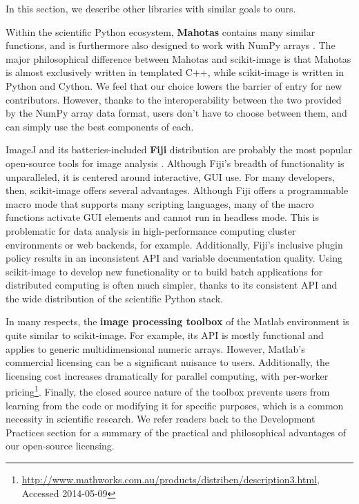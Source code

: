 \documentclass[fleqn,12pt]{wlpeerj}
\begin{document}
In this section, we describe other libraries with similar goals to ours.

Within the scientific Python ecosystem, \textbf{Mahotas} contains many similar
functions, and is furthermore also designed to work with NumPy arrays
\citep{Mahotas}. The major philosophical difference between Mahotas and
scikit-image is that Mahotas is almost exclusively written in templated C++,
while scikit-image is written in Python and Cython. We feel that our choice
lowers the barrier of entry for new contributors. However,
thanks to the interoperability between the two provided by the NumPy array
data format, users don't have to choose between them, and can simply use the
best components of each.

ImageJ and its batteries-included \textbf{Fiji} distribution are probably the most
popular open-source tools for image analysis \citep{imagej,Fiji}. Although 
Fiji's breadth of functionality is unparalleled, it is centered around 
interactive, GUI use. For many developers, then, scikit-image offers several
advantages. Although Fiji offers a
programmable macro mode that supports many scripting languages, many of the
macro functions activate GUI elements and cannot run in headless mode. This
is problematic for data analysis in high-performance computing
cluster environments or web backends, for example. Additionally, Fiji's
inclusive plugin policy results in an inconsistent API and variable
documentation quality. Using scikit-image to develop new functionality or
to build batch applications for distributed computing is often much simpler,
thanks to its consistent API and the wide distribution of the scientific
Python stack.

In many respects, the \textbf{image processing toolbox} of the Matlab environment is
quite similar to scikit-image. For example, its API is mostly functional and
applies to generic multidimensional numeric arrays. However, Matlab's
commercial licensing can be a significant nuisance to users. Additionally,
the licensing cost increases dramatically for parallel computing, with
per-worker pricing\footnote{\url{http://www.mathworks.com.au/products/distriben/description3.html}, Accessed 2014-05-09}.
Finally, the closed source nature of the toolbox prevents users from
learning from the code or modifying it for specific purposes, which is a
common necessity in scientific research. We refer readers back to the
Development Practices section for a summary of the practical and
philosophical advantages of our open-source licensing.
\end{document}
